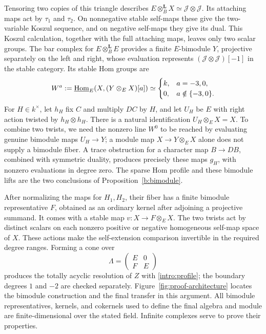 Tensoring two copies of this triangle describes
$E\otimes_B^{\mathbf L}X\simeq\mathcal J\otimes\mathcal J$.
Its attaching maps act by $\tau_1$ and $\tau_2$. On nonnegative
stable self-maps these give the two-variable Koszul sequence, and on
negative self-maps they give its dual. This Koszul calculation, together
with the full attaching maps, leaves only two scalar groups. The bar
complex for $E\otimes_B^{\mathbf L}E$ provides a finite $E$-bimodule
$Y$, projective separately on the left and right, whose evaluation
represents $(\mathcal J\otimes\mathcal J)[-1]$ in the stable category.
Its stable Hom groups are
\[
 W^a:=\underline{\operatorname{Hom}}_E(X,(Y\otimes_E X)[a])\simeq
 \begin{cases}k,&a=-3,0,\\0,&a\notin\{-3,0\}.\end{cases}
\]
For $H\in k^\times$, let $h_H$ fix $C$ and multiply $DC$ by $H$,
and let $U_H$ be $E$ with right action twisted by $h_H\otimes h_H$.
There is a natural identification $U_H\otimes_E X=X$.
To combine two twists, we need the nonzero line $W^0$ to be reached
by evaluating genuine bimodule maps $U_H\to Y$; a module map
$X\to Y\otimes_E X$ alone does not supply a bimodule fiber.
A trace obstruction for a character map $B\to DB$, combined with
symmetric duality, produces precisely these maps $g_H$, with nonzero
evaluations in degree zero. The sparse Hom profile and these bimodule
lifts are the two conclusions of Proposition~\ref{b:bimodule}.

After normalizing the maps for $H_1,H_2$, their fiber has a finite
bimodule representative $F$, obtained as an ordinary kernel after
adjoining a projective summand. It comes with a stable map
$v:X\to F\otimes_E X$. The two twists act by distinct scalars on each
nonzero positive or negative homogeneous self-map space of $X$.
These actions make the self-extension comparison invertible in the
required degree ranges. Forming a cone over
\[
 \Lambda=\begin{pmatrix}E&0\\ F&E\end{pmatrix}
\]
produces the totally acyclic resolution of $Z$ with
\eqref{intro:profile}; the boundary degrees $1$ and $-2$ are checked
separately. Figure~\ref{fig:proof-architecture} locates the bimodule
construction and the final transfer in this argument.
All bimodule representatives, kernels, and cokernels used to define
the final algebra and module are finite-dimensional over the stated
field.  Infinite complexes serve to prove their properties.

